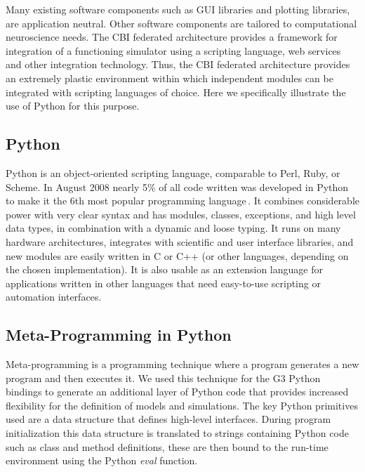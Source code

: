 \documentclass[12pt]{article}
\begin{document}
Many existing software components such as GUI libraries and plotting
libraries, are application neutral.  Other software components are
tailored to computational neuroscience needs.  The CBI federated
architecture provides a framework for integration of a functioning
simulator using a scripting language, web services and other
integration technology.  Thus, the CBI federated architecture provides
an extremely plastic environment within which independent modules can
be integrated with scripting languages of choice.  Here we
specifically illustrate the use of Python for this purpose.

\subsection{Python}

Python is an object-oriented scripting language, comparable to Perl,
Ruby, or Scheme.  In August 2008 nearly 5\% of all code written was
developed in Python to make it the 6th most popular programming
language\,\cite{software09:_tiobe_progr_commun_index}. It combines
considerable power with very clear syntax and has modules, classes,
exceptions, and high level data types, in combination with a dynamic
and loose typing. It runs on many hardware architectures, integrates
with scientific and user interface libraries, and new modules are
easily written in C or C++ (or other languages, depending on the
chosen implementation). It is also usable as an extension language for
applications written in other languages that need easy-to-use
scripting or automation interfaces.


\subsection{Meta-Programming in Python}

Meta-programming is a programming technique where a program generates
a new program and then executes it.  We used this technique for the G3
Python bindings to generate an additional layer of Python code that
provides increased flexibility for the definition of models and
simulations.  The key Python primitives used are a data structure that
defines high-level interfaces.  During program initialization this
data structure is translated to strings containing Python code such as
class and method definitions, these are then bound to the run-time
environment using the Python {\it eval} function.
\end{document}
